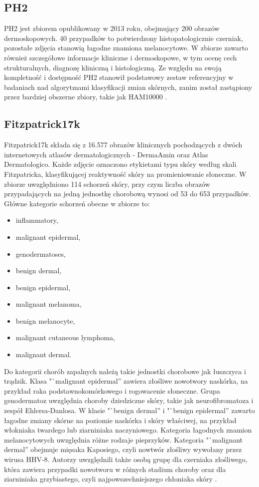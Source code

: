\subsection{PH2}
PH2 jest zbiorem opublikowany w 2013 roku, obejmujący 200 obrazów dermoskopowych. 
40 przypadków to potwierdzony histopatologicznie czerniak, pozostałe zdjęcia stanowią łagodne znamiona melanocytowe.
W zbiorze zawarto również szczegółowe informacje kliniczne i dermoskopowe, w tym ocenę cech strukturalnych, diagnozę kliniczną i histologiczną.
Ze względu na swoją kompletność i dostępność PH2 stanowił podstawowy zestaw referencyjny w badaniach nad algorytmami klasyfikacji zmian skórnych, zanim został zastąpiony przez bardziej obszerne zbiory, takie jak HAM10000 \cite{Rozeira_2013}.

\subsection{Fitzpatrick17k}
Fitzpatrick17k składa się z 16.577 obrazów klinicznych pochodzących z dwóch internetowych atlasów dermatologicznych - DermaAmin oraz Atlas Dermatologico.
Każde zdjęcie oznaczono etykietami typu skóry według skali Fitzpatricka, klasyfikującej reaktywność skóry na promieniowanie słoneczne.
W zbiorze uwzględniono 114 schorzeń skóry, przy czym liczba obrazów przypadających na jedną jednostkę chorobową wynosi od 53 do 653 przypadków.
Główne kategorie schorzeń obecne w zbiorze to:
\begin{itemize}
	\item inflammatory,
	\item malignant epidermal,
	\item genodermatoses,
	\item benign dermal,
	\item benign epidermal,
	\item malignant melanoma,
	\item benign melanocyte,
	\item malignant cutaneous lymphoma,
	\item malignant dermal.
\end{itemize}
Do kategorii chorób zapalnych należą takie jednostki chorobowe jak łuszczyca i trądzik.
Klasa "`malignant epidermal'' zawiera złośliwe nowotwory naskórka, na przykład raka podstawnokomórkowego i rogowacenie słoneczne.
Grupa genodermatoz uwzględnia choroby dziedziczne skóry, takie jak neurofibromatoza i zespół Ehlersa-Danlosa.
W klasie "`benign dermal'' i "`benign epidermal'' zawarto łagodne zmiany skórne na poziomie naskórka i skóry właściwej, na przykład włokniaka twardego lub ziarniniaka naczyniowego.
Kategoria łagodnych znamion melanocytowych uwzględnia różne rodzaje pieprzyków.
Kategoria "`malignant dermal'' obejmuje mięsaka Kaposiego, czyli nowtwór złośliwy wywołany przez wirusa HHV-8.
Autorzy uwzględnili także osobą grupę dla czerniaka złośliwego, która zawiera przypadki nowotworu w różnych stadium choroby oraz dla ziarniniaka grzybiastego, czyli najpowszechniejszego chłoniaka skóry \cite{groh2021evaluating, Schneider_Dittmer_2017, Bowman_Hogan_Sanusi_2001}.

